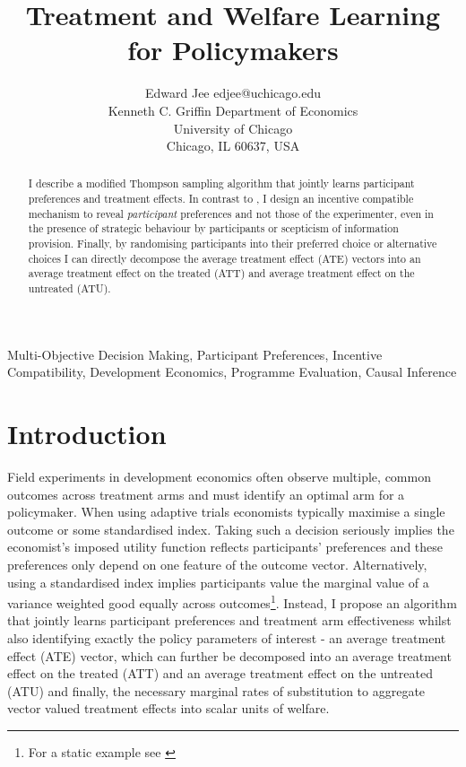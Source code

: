 \documentclass[twoside,11pt]{article}
\begin{document}
\title{
  Treatment and Welfare Learning for Policymakers
}

\author{\name Edward Jee \email edjee@uchicago.edu \\
       \addr Kenneth C. Griffin Department of Economics\\
       University of Chicago\\
       Chicago, IL 60637, USA}


\maketitle

\begin{abstract}%
I describe a modified Thompson sampling algorithm that jointly learns participant preferences and treatment 
effects. In contrast to \cite{lin2022preference}, I design an incentive 
compatible mechanism to reveal \emph{participant} preferences and not those of 
the experimenter, even in the presence of strategic behaviour by participants 
or scepticism of information 
provision. Finally, by randomising 
participants into their preferred choice or alternative choices I can directly 
decompose the average treatment effect (ATE) vectors into an average treatment 
effect on the treated (ATT) and average treatment effect on the untreated (ATU). 
\end{abstract}

\begin{keywords}
 Multi-Objective Decision Making, Participant Preferences, Incentive Compatibility, 
 Development Economics, Programme Evaluation, Causal Inference 
\end{keywords}

\section{Introduction}

Field experiments in development economics often observe multiple, common outcomes 
across treatment arms and must identify an optimal arm for a policymaker. 
 When using adaptive trials economists typically maximise a single outcome or 
 some standardised index. Taking such a decision seriously 
implies the economist's imposed utility function reflects participants' preferences 
and these preferences only depend on one feature of the outcome vector. Alternatively, 
using a standardised index implies 
participants value the marginal value of a variance weighted good equally across 
outcomes\footnote{For a static example see \cite{ashraf2010a,blattman2017a,bandiera2017a}}. Instead, I propose an algorithm that jointly learns participant 
preferences and treatment arm effectiveness whilst also identifying exactly the 
policy parameters of interest - an average treatment effect (ATE) vector, which 
can further be decomposed into an average treatment effect on the treated (ATT) and 
an average treatment effect on the untreated (ATU) and finally, the necessary marginal 
rates of substitution to 
aggregate vector valued treatment effects into scalar units of  welfare. 
\end{document}
